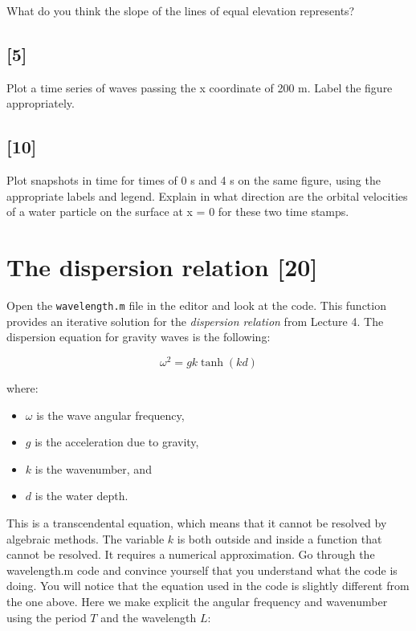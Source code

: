 \documentclass[a4paper,english]{scrartcl}
\begin{document}
What do you think the slope of the lines of equal elevation represents?

\subsection{[5]}
 
Plot a time series of waves passing the x coordinate of 200 m. Label the figure appropriately.

\subsection{[10]}

Plot snapshots in time for times of 0 s and 4 s on the same figure, using the appropriate labels and legend. Explain in what direction are the orbital velocities of a water particle on the surface at x = 0 for these two time stamps.

\section{The dispersion relation [20]}

Open the \texttt{wavelength.m} file in the editor and look at the code. This function provides an iterative solution for the \textit{dispersion relation} from Lecture 4. The dispersion equation for gravity waves is the following:  

\[
\omega^2 = g k \tanh(kd)
\]

where:  
\begin{itemize}
    \item \( \omega \) is the wave angular frequency,
    \item \( g \) is the acceleration due to gravity,
    \item \( k \) is the wavenumber, and
    \item \( d \) is the water depth.
\end{itemize}

This is a transcendental equation, which means that it cannot be resolved by algebraic methods. The variable $k$ is both outside and inside a function that cannot be resolved. It requires a numerical approximation.
Go through the wavelength.m code and convince yourself that you understand what the code is doing. You will notice that the equation used in the code is slightly different from the one above. Here we make explicit the angular frequency and wavenumber using the period $T$ and the wavelength $L$:
\end{document}
